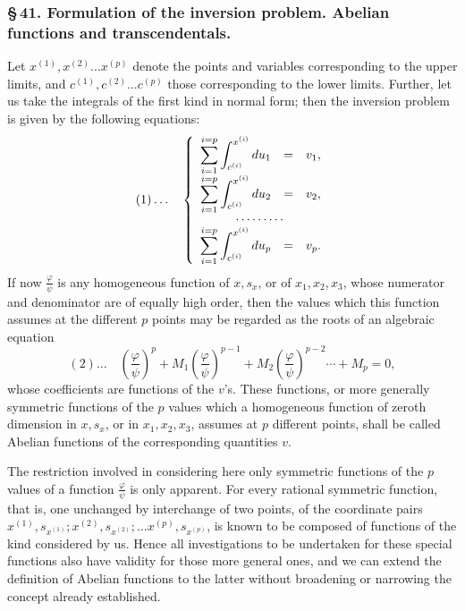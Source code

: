 \documentclass[10pt]{article}
\begin{document}
\subsubsection*{\S\,41. Formulation of the inversion problem. Abelian functions and transcendentals.}

Let \(x^{(1)},x^{(2)}\ldots x^{(p)}\) denote the points and variables corresponding to the upper limits, and \(c^{(1)},c^{(2)}\ldots c^{(p)}\) those corresponding to the lower limits. Further, let us take the integrals of the first kind in normal form; then the inversion problem is given by the following equations:
\[
(1)\ldots\quad
\left\{\begin{array}{rcl}
\displaystyle\sum_{i=1}^{i=p}\int_{c^{(i)}}^{x^{(i)}}du_1&=&v_1,\\[0.35em]
\displaystyle\sum_{i=1}^{i=p}\int_{c^{(i)}}^{x^{(i)}}du_2&=&v_2,\\[-0.1em]
\multicolumn{3}{c}{\cdots\cdots\cdots}\\[-0.1em]
\displaystyle\sum_{i=1}^{i=p}\int_{c^{(i)}}^{x^{(i)}}du_p&=&v_p.
\end{array}\right.
\]
If now \(\frac{\varphi}{\psi}\) is any homogeneous function of \(x,s_x\), or of \(x_1,x_2,x_3\), whose numerator and denominator are of equally high order, then the values which this function assumes at the different \(p\) points may be regarded as the roots of an algebraic equation
\[
(2)\ldots\quad
\left(\frac{\varphi}{\psi}\right)^p+M_1\left(\frac{\varphi}{\psi}\right)^{p-1}+M_2\left(\frac{\varphi}{\psi}\right)^{p-2}\cdots+M_p=0,
\]
whose coefficients are functions of the \(v\)'s. These functions, or more generally symmetric functions of the \(p\) values which a homogeneous function of zeroth dimension in \(x,s_x\), or in \(x_1,x_2,x_3\), assumes at \(p\) different points, shall be called Abelian functions of the corresponding quantities \(v\).

The restriction involved in considering here only symmetric functions of the \(p\) values of a function \(\frac{\varphi}{\psi}\) is only apparent. For every rational symmetric function, that is, one unchanged by interchange of two points, of the coordinate pairs \(x^{(1)},s_{x^{(1)}};x^{(2)},s_{x^{(2)}};\ldots x^{(p)},s_{x^{(p)}}\), is known to be composed of functions of the kind considered by us. Hence all investigations to be undertaken for these special functions also have validity for those more general ones, and we can extend the definition of Abelian functions to the latter without broadening or narrowing the concept already established.
\end{document}

